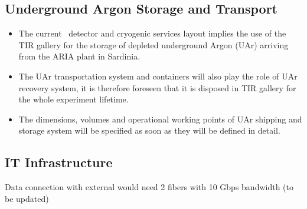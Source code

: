 \subsection{Underground Argon Storage and Transport}
\label{sec:UndegroundArgonStorage}
\begin{itemize}
\item The current \DSks\ detector and cryogenic services layout implies the use of the TIR gallery for the storage of depleted underground Argon (UAr) arriving from the ARIA plant in Sardinia.
\item The UAr transportation system and containers will also play the role of UAr recovery system, it is therefore foreseen that it is disposed in TIR gallery for the whole experiment lifetime.
\item The dimensions, volumes and operational working points of UAr shipping and storage system will be specified as soon as they will be defined in detail.
\end{itemize}


\subsection{IT Infrastructure}
\label{sec:ITInfrastructure}

Data connection with external would need 2 fibers with 10 Gbps bandwidth (to be updated)


